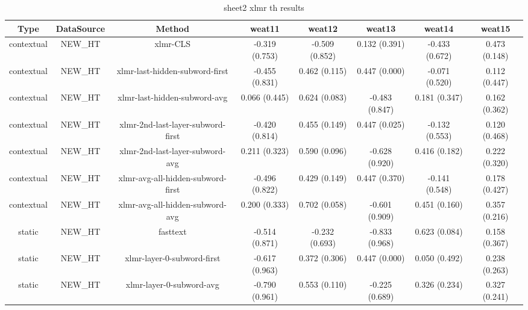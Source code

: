 \begin{sidewaystable}[htb]
    \centering
    \caption{sheet2 xlmr th results}
    \label{appendix_tab:sheet2_xlmr_th_results}
    \small
    \begin{tabular}{@{}cccccccc@{}}
        \toprule
        Type & DataSource & Method & weat11 & weat12 & weat13 & weat14 & weat15 \\
        \midrule
        contextual & NEW\_HT & xlmr-CLS & -0.319 (0.753) & -0.509 (0.852) & 0.132 (0.391) & -0.433 (0.672) & 0.473 (0.148) \\
        contextual & NEW\_HT & xlmr-last-hidden-subword-first & -0.455 (0.831) & 0.462 (0.115) & 0.447 (0.000) & -0.071 (0.520) & 0.112 (0.447) \\
        contextual & NEW\_HT & xlmr-last-hidden-subword-avg & 0.066 (0.445) & 0.624 (0.083) & -0.483 (0.847) & 0.181 (0.347) & 0.162 (0.362) \\
        contextual & NEW\_HT & xlmr-2nd-last-layer-subword-first & -0.420 (0.814) & 0.455 (0.149) & 0.447 (0.025) & -0.132 (0.553) & 0.120 (0.468) \\
        contextual & NEW\_HT & xlmr-2nd-last-layer-subword-avg & 0.211 (0.323) & 0.590 (0.096) & -0.628 (0.920) & 0.416 (0.182) & 0.222 (0.320) \\
        contextual & NEW\_HT & xlmr-avg-all-hidden-subword-first & -0.496 (0.822) & 0.429 (0.149) & 0.447 (0.370) & -0.141 (0.548) & 0.178 (0.427) \\
        contextual & NEW\_HT & xlmr-avg-all-hidden-subword-avg & 0.200 (0.333) & 0.702 (0.058) & -0.601 (0.909) & 0.451 (0.160) & 0.357 (0.216) \\
        static & NEW\_HT & fasttext & -0.514 (0.871) & -0.232 (0.693) & -0.833 (0.968) & 0.623 (0.084) & 0.158 (0.367) \\
        static & NEW\_HT & xlmr-layer-0-subword-first & -0.617 (0.963) & 0.372 (0.306) & 0.447 (0.000) & 0.050 (0.492) & 0.238 (0.263) \\
        static & NEW\_HT & xlmr-layer-0-subword-avg & -0.790 (0.961) & 0.553 (0.110) & -0.225 (0.689) & 0.326 (0.234) & 0.327 (0.241) \\
        \bottomrule
    \end{tabular}
\end{sidewaystable}